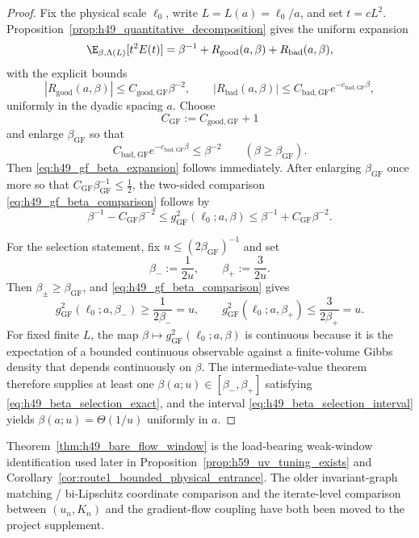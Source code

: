 \begin{proof}
Fix the physical scale $\ell_0$, write $L=L(a)=\ell_0/a$, and set $t=cL^2$.
Proposition~\ref{prop:h49_quantitative_decomposition} gives the uniform expansion
\[
\E_{\beta,\Lambda(L)}[t^2E(t)]
=
\beta^{-1}+R_{\mathrm{good}}(a,\beta)+R_{\mathrm{bad}}(a,\beta),
\]
with the explicit bounds
\[
|R_{\mathrm{good}}(a,\beta)|\le C_{\mathrm{good,GF}}\beta^{-2},
\qquad
|R_{\mathrm{bad}}(a,\beta)|\le C_{\mathrm{bad,GF}}e^{-c_{\mathrm{bad,GF}}\beta},
\]
uniformly in the dyadic spacing $a$.
Choose
\[
C_{\mathrm{GF}}:=C_{\mathrm{good,GF}}+1
\]
and enlarge $\beta_{\mathrm{GF}}$ so that
\[
C_{\mathrm{bad,GF}}e^{-c_{\mathrm{bad,GF}}\beta}\le \beta^{-2}
\qquad (\beta\ge \beta_{\mathrm{GF}}).
\]
Then \eqref{eq:h49_gf_beta_expansion} follows immediately.
After enlarging $\beta_{\mathrm{GF}}$ once more so that $C_{\mathrm{GF}}\beta_{\mathrm{GF}}^{-1}\le\tfrac12$, the two-sided comparison \eqref{eq:h49_gf_beta_comparison} follows by
\[
\beta^{-1}-C_{\mathrm{GF}}\beta^{-2}
\le g_{\mathrm{GF}}^2(\ell_0;a,\beta)
\le \beta^{-1}+C_{\mathrm{GF}}\beta^{-2}.
\]

For the selection statement, fix $u\le (2\beta_{\mathrm{GF}})^{-1}$ and set
\[
\beta_-:=\frac{1}{2u},\qquad \beta_+:=\frac{3}{2u}.
\]
Then $\beta_\pm\ge\beta_{\mathrm{GF}}$, and \eqref{eq:h49_gf_beta_comparison} gives
\[
 g_{\mathrm{GF}}^2(\ell_0;a,\beta_-)
 \ge
 \frac{1}{2\beta_-}=u,
 \qquad
 g_{\mathrm{GF}}^2(\ell_0;a,\beta_+)
 \le
 \frac{3}{2\beta_+}=u.
\]
For fixed finite $L$, the map $\beta\mapsto g_{\mathrm{GF}}^2(\ell_0;a,\beta)$ is continuous because it is the expectation of a bounded continuous observable against a finite-volume Gibbs density that depends continuously on $\beta$.
The intermediate-value theorem therefore supplies at least one $\beta(a;u)\in[\beta_-,\beta_+]$ satisfying \eqref{eq:h49_beta_selection_exact}, and the interval \eqref{eq:h49_beta_selection_interval} yields $\beta(a;u)=\Theta(1/u)$ uniformly in $a$.
\end{proof}

\begin{remark}
Theorem~\ref{thm:h49_bare_flow_window} is the load-bearing weak-window identification used later in Proposition~\ref{prop:h59_uv_tuning_exists} and Corollary~\ref{cor:route1_bounded_physical_entrance}.
The older invariant-graph matching / bi-Lipschitz coordinate comparison and the iterate-level comparison between $(u_n,K_n)$ and the gradient-flow coupling have both been moved to the project supplement.
\end{remark}

